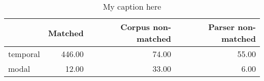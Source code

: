 \begin{table}[!ht]
\centering
\begin{tabular}{lrrr}
\toprule
{} &  Matched &  Corpus non-matched &  Parser non-matched \\
\midrule
temporal &   446.00 &               74.00 &               55.00 \\
modal    &    12.00 &               33.00 &                6.00 \\
\bottomrule
\end{tabular}
\caption{My caption here}
\label{tab:DEICTICITY-ocd-data}
\end{table}